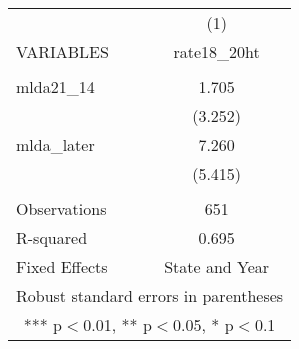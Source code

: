 \begin{tabular}{lc} \hline
 & (1) \\
VARIABLES & rate18\_20ht \\ \hline
 &  \\
mlda21\_14 & 1.705 \\
 & (3.252) \\
mlda\_later & 7.260 \\
 & (5.415) \\
 &  \\
Observations & 651 \\
R-squared & 0.695 \\
 Fixed Effects & State and Year \\ \hline
\multicolumn{2}{c}{ Robust standard errors in parentheses} \\
\multicolumn{2}{c}{ *** p$<$0.01, ** p$<$0.05, * p$<$0.1} \\
\end{tabular}
